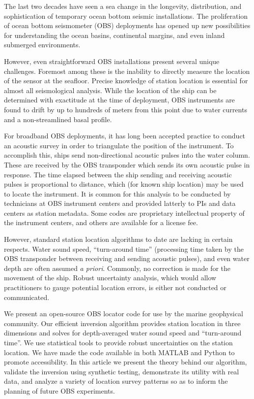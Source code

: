 The last two decades have seen a sea change in the longevity, distribution, and sophistication of temporary ocean bottom seismic installations. The proliferation of ocean bottom seismometer (OBS) deployments has opened up new possibilities for understanding the ocean basins, continental margins, and even inland submerged environments. 

However, even straightforward OBS installations present several unique challenges. Foremost among these is the inability to directly measure the location of the sensor at the seafloor. Precise knowledge of station location is essential for almost all seismological analysis. While the location of the ship can be determined with exactitude at the time of deployment, OBS instruments are found to drift by up to hundreds of meters from this point due to water currents and a non-streamlined  basal profile. 

For broadband OBS deployments, it has long been accepted practice to conduct an acoustic survey in order to triangulate the position of the instrument. To accomplish this, ships send non-directional acoustic pulses into the water column. These are received by the OBS transponder which sends its own acoustic pulse in response. The time elapsed between the ship sending and receiving acoustic pulses is proportional to distance, which (for known ship location) may be used to locate the instrument. It is common for this analysis to be conducted by technicians at OBS instrument centers and provided latterly to PIs and data centers as station metadata. Some codes are proprietary intellectual property of the instrument centers, and others are available for a license fee. 

However, standard station location algorithms to date are lacking in certain respects. Water sound speed, ``turn-around time'' (processing time taken by the OBS transponder between receiving and sending acoustic pulses), and even water depth are often assumed \textit{a priori}. Commonly, no correction is made for the movement of the ship. Robust uncertainty analysis, which would allow practitioners to gauge potential location errors, is either not conducted or communicated. 

We present an open-source OBS locator code for use by the marine geophysical community. Our efficient inversion algorithm provides station location in three dimensions and solves for depth-averaged water sound speed and ``turn-around time''. We use statistical tools to provide robust uncertainties on the station location. We have made the code available in both MATLAB and Python to promote accessibility. In this article we present the theory behind our algorithm, validate the inversion using synthetic testing, demonstrate its utility with real data, and analyze a variety of location survey patterns so as to inform the planning of future OBS experiments. 